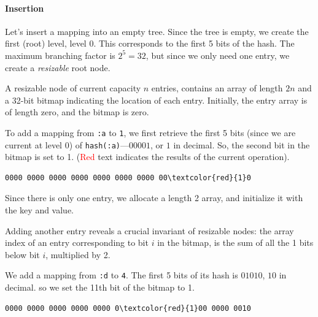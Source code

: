 \documentclass[preprint]{sigplanconf}
\begin{document}
\paragraph{Insertion}
Let's insert a mapping into an empty tree.
Since the tree is empty, we create the
first (root) level, level 0. This corresponds
to the first 5 bits of the hash. The maximum
branching factor is $2^5=32$, but since we
only need one entry, we create a \textit{resizable}
root node.

A resizable node of current capacity $n$ entries,
contains an array of length $2n$ and a 32-bit
bitmap indicating the location of each entry.
Initially, the entry array is of length zero, and the bitmap
is zero.

To add a mapping from
\texttt{:a} to \texttt{1}, we first retrieve
the first 5 bits (since we are current at level 0)
of \texttt{hash(:a)}---$00001$, or $1$
in decimal. So, the second bit in the bitmap
is set to 1. (\textcolor{red}{Red} text indicates the results of the
current operation).

\begin{Verbatim}[commandchars=\\\{\},codes={\catcode`$=3\catcode`^=7\catcode`_=8}]
0000 0000 0000 0000 0000 0000 0000 00\textcolor{red}{1}0
\end{Verbatim}


Since there is only one entry, we allocate a length 2 array,
and initialize it with the key and value.

Adding another entry reveals a crucial invariant
of resizable nodes: the array index of an entry
corresponding to bit $i$ in the bitmap,
is the sum of all the 1 bits below bit $i$,
multiplied by 2.

We add a mapping from \texttt{:d} to \texttt{4}.
The first 5 bits of its hash is $01010$, $10$ in decimal.
so we set the 11th bit of the bitmap to 1.

\begin{Verbatim}[commandchars=\\\{\},codes={\catcode`$=3\catcode`^=7\catcode`_=8}]
0000 0000 0000 0000 0000 0\textcolor{red}{1}00 0000 0010
\end{Verbatim}
\end{document}
